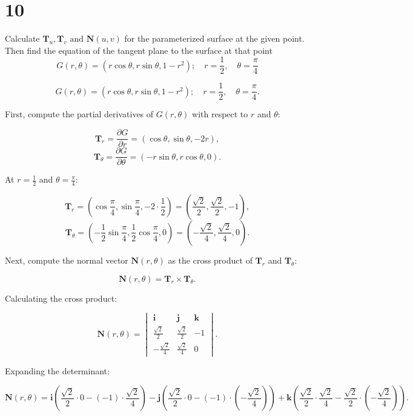 \documentclass[hidelinks]{article}
\begin{document}
\newpage
\section*{10}
Calculate $\textbf{T}_u, \textbf{T}_v \text{ and } \textbf{N}(u, v)$ for the parameterized surface at the given point. Then find the equation of the tangent plane to the surface at that point
$$
G(r, \theta)=(r \cos \theta, r \sin \theta, 1 - r^2) ; \quad r=\frac{1}{2}, \quad \theta=\frac{\pi}{4}
$$

\[
G(r, \theta) = (r \cos \theta, r \sin \theta, 1 - r^2); \quad r = \frac{1}{2}, \quad \theta = \frac{\pi}{4}.
\]

First, compute the partial derivatives of \( G(r, \theta) \) with respect to \( r \) and \( \theta \):

\[
\mathbf{T}_r = \frac{\partial G}{\partial r} = \left( \cos \theta, \sin \theta, -2r \right),
\]
\[
\mathbf{T}_\theta = \frac{\partial G}{\partial \theta} = \left( -r \sin \theta, r \cos \theta, 0 \right).
\]

At \( r = \frac{1}{2} \) and \( \theta = \frac{\pi}{4} \):

\[
\mathbf{T}_r = \left( \cos \frac{\pi}{4}, \sin \frac{\pi}{4}, -2 \cdot \frac{1}{2} \right) = \left( \frac{\sqrt{2}}{2}, \frac{\sqrt{2}}{2}, -1 \right),
\]
\[
\mathbf{T}_\theta = \left( -\frac{1}{2} \sin \frac{\pi}{4}, \frac{1}{2} \cos \frac{\pi}{4}, 0 \right) = \left( -\frac{\sqrt{2}}{4}, \frac{\sqrt{2}}{4}, 0 \right).
\]

Next, compute the normal vector \( \mathbf{N}(r, \theta) \) as the cross product of \( \mathbf{T}_r \) and \( \mathbf{T}_\theta \):

\[
\mathbf{N}(r, \theta) = \mathbf{T}_r \times \mathbf{T}_\theta.
\]

Calculating the cross product:

\[
\mathbf{N}(r, \theta) = \begin{vmatrix}
\mathbf{i} & \mathbf{j} & \mathbf{k} \\
\frac{\sqrt{2}}{2} & \frac{\sqrt{2}}{2} & -1 \\
-\frac{\sqrt{2}}{4} & \frac{\sqrt{2}}{4} & 0
\end{vmatrix}.
\]

Expanding the determinant:

\[
\mathbf{N}(r, \theta) = \mathbf{i} \left( \frac{\sqrt{2}}{2} \cdot 0 - (-1) \cdot \frac{\sqrt{2}}{4} \right) - \mathbf{j} \left( \frac{\sqrt{2}}{2} \cdot 0 - (-1) \cdot \left( -\frac{\sqrt{2}}{4} \right) \right) + \mathbf{k} \left( \frac{\sqrt{2}}{2} \cdot \frac{\sqrt{2}}{4} - \frac{\sqrt{2}}{2} \cdot \left( -\frac{\sqrt{2}}{4} \right) \right).
\]
\end{document}
